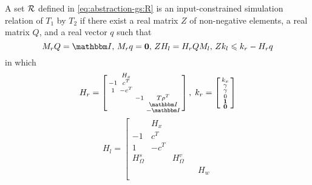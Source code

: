\begin{theorem}
  \label{thm:abstraction-gs:sufficient-LP}
  A set $\mathcal{R}$ defined in \eqref{eq:abstraction-gs:R} is an input-constrained simulation relation of $T_{1}$ by $T_{2}$ %
if there exist a real matrix $Z$ of non-negative elements, a real matrix $Q$, and a real vector $q$ such that
    \begin{equation}
      \label{eq:abstraction-gs:sufficient-LP}
      M_{r} Q = \IdentityMatrix,\,
      M_{r} q = \Zero,\,
      Z H_{l} = H_{r} Q M_{l},\,
      Z k_{l} \leqslant k_{r} - H_{r} q
    \end{equation}
  in which
  \begin{equation*}
        H_{r} =
    \left[ \begin{smallmatrix}
      & H_{x} \\ %
      -1  & c^{T} \\ %
      1   & -c^{T} \\ %
      & & -1 & T \rho^{T} \\
      & & & \IdentityMatrix \\
      & & & -\IdentityMatrix
    \end{smallmatrix} \right], \;
    k_{r} =
    \left[ \begin{smallmatrix}
      k_{x} \\
      \gamma \\
      \gamma \\
      0 \\
      \One \\
      \Zero
    \end{smallmatrix} \right]
  \end{equation*}
  \begin{equation*}
    H_{l} =
    \left[ \begin{smallmatrix}
        & H_{x} \\ %
      -1  & c^{T} \\ %
      1   & -c^{T} \\ %
      H_{\Omega}^{s} & & H_{\Omega}^{v} \\
      & & & & H_{w} \\

\end{smallmatrix}
\end{equation*}
\end{theorem}
